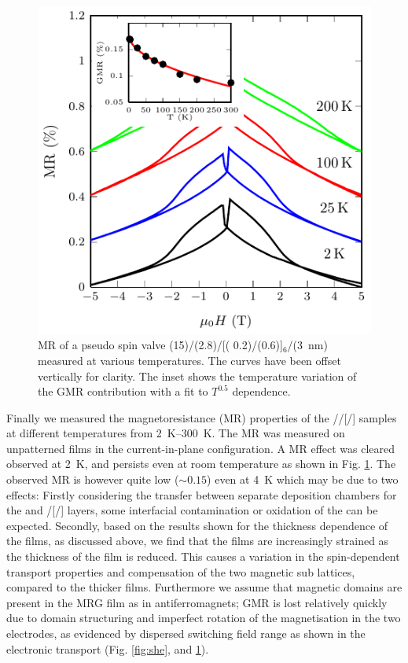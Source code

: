 \documentclass[reprint,aip,apl,floatfix,linenumbers,superscriptaddress]{revtex4-1}
\begin{document}
\begin{figure}
\includegraphics[width=1.0\columnwidth]{Transport-Fig5.pdf}
\caption{MR of a pseudo spin valve (15)/(2.8)/[(
0.2)/(0.6)]$_6$/(\SI{3}{\nano\metre})  measured at various 
temperatures. The curves have been offset vertically for clarity.  The inset 
shows the temperature variation of the GMR contribution with a fit to $T^{0.5
}$ dependence.}
\label{fig:gmr}
\end{figure}

Finally we measured the magnetoresistance (MR) properties of the //[/] samples at different temperatures from \SIrange{2}{300}{
\kelvin}. The MR was measured on unpatterned films in the current-in-plane 
configuration. A MR effect was cleared observed at \SI{2}{\kelvin}, and 
persists even at room temperature as shown in Fig. \ref{fig:gmr}. The 
observed MR is however quite low ($\sim \num{0.15}$) even at \SI{4}{\kelvin} 
which may be due to two effects: Firstly considering the transfer between 
separate deposition chambers for the  and /[/] 
layers, some interfacial contamination or oxidation of the  can be 
expected.  Secondly, based on the results shown for the thickness dependence 
of the  films, as discussed above, we find that the films are 
increasingly strained as the thickness of the film is reduced. This causes a 
variation in the spin-dependent transport properties and compensation of the 
two magnetic sub lattices, compared to the thicker films. Furthermore we 
assume that magnetic domains are present in the MRG film as in 
antiferromagnets; GMR is lost relatively quickly due to domain structuring 
and imperfect rotation of the magnetisation in the two electrodes, as 
evidenced by dispersed switching field range as shown in the electronic 
transport (Fig. \ref{fig:she}, and \ref{fig:gmr}).
\end{document}
